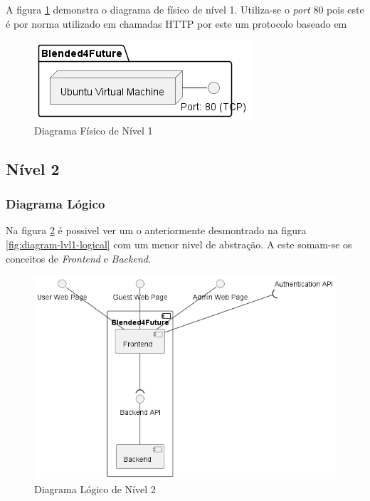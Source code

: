 A figura \ref{fig:diagram-lvl1-physical} demonstra o diagrama de físico de nível 1. Utiliza-se o \textit{port} 80 pois este é por norma utilizado em chamadas \Acrshort{HTTP} por este um protocolo baseado em 

\begin{figure}[h!tbp]
    \centering
    \includegraphics[width=0.5\linewidth]{capitulos/cap3-analisedoproblema/assets/arquiteturasistema/physical/physical_l1.png}
    \caption{Diagrama Físico de Nível 1}
    \label{fig:diagram-lvl1-physical}
\end{figure}





\subsection{Nível 2}

\subsubsection{Diagrama Lógico}

Na figura \ref{fig:diagram-lvl2-logical} é possivel ver um o anteriormente desmontrado na figura \ref{fig:diagram-lvl1-logical} com um menor nivel de abstração.
A este somam-se os conceitos de \textit{Frontend} e \textit{Backend}.

\begin{figure}[h!tbp]
    \centering
    \includegraphics[width=0.7\linewidth]{capitulos/cap3-analisedoproblema/assets/arquiteturasistema/logical/logical_l2.png}
    \caption{Diagrama Lógico de Nível 2}
    \label{fig:diagram-lvl2-logical}
\end{figure}

